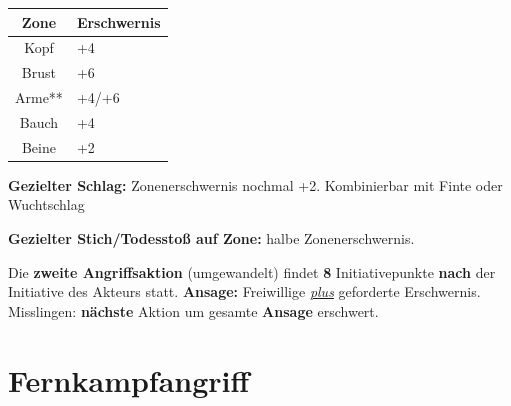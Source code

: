{}{
\begin{center}
\end{center}
\begin{center}
    \begin{tabular}{| c | l |}
        \hline
        \textbf{Zone }& \textbf{Erschwernis}\\
        \hline
        Kopf & +4\\
        \hline
        Brust & +6\\
        \hline
        Arme**& +4/+6\\
        \hline
        Bauch & +4\\
        \hline
        Beine & +2\\
        \hline
    \end{tabular}
\end{center}
\textbf{Gezielter Schlag:} Zonenerschwernis nochmal +2. Kombinierbar mit Finte oder Wuchtschlag

\textbf{Gezielter Stich/Todesstoß auf Zone:} halbe Zonenerschwernis.}
Die \textbf{zweite Angriffsaktion} (umgewandelt) findet \textbf{8} Initiativepunkte \textbf{nach} der Initiative des Akteurs statt.
\textbf{Ansage:} Freiwillige \underline{\textit{plus}} geforderte Erschwernis.
Misslingen: \textbf{nächste} Aktion um gesamte \textbf{Ansage} erschwert.

\chapter{Fernkampfangriff}
